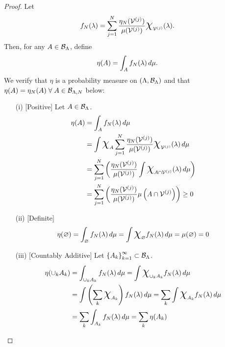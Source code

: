 \begin{proof}
Let
\begin{equation}\label{eq:finiteradon}
f_N (\param) = \sum_{j=1}^{N} \frac{\eta_N (\VV^{(j)}) }{\mu (\VV^{(j)})} \Chi_{\VV^{(j)}} (\param).
\end{equation}
Then, for any $A\in\mathcal{B}_{\Lambda}$, define
\begin{equation}\label{eq:approxmeasure}
\eta (A) = \int_A f_N (\lambda) \, d\mu.
\end{equation}
We verify that $\eta$ is a probability measure on $({\Lambda}, \mathcal{B}_{\Lambda})$ and that $\eta(A) = \eta_N(A) \; \forall \; A\in\mathcal{B}_{{\Lambda}, N}$ below:
\begin{itemize}
\item[(i)][Positive]
Let $A\in \mathcal{B}_{{\Lambda}}$.
\begin{equation*}
\begin{split}
\eta (A) &= \int_A f_N (\param) \, d\mu \\
&=  \int \Chi_A \sum_{j=1}^{N} \frac{\eta_N (\VV^{(j)}) }{\mu (\VV^{(j)})} \Chi_{\VV^{(j)}} (\param) \, d\mu \\
&= \sum_{j=1}^{N} \left ( \frac{\eta_N (\VV^{(j)}) }{\mu (\VV^{(j)})} \int \Chi_{A\cap\VV^{(j)}} (\param) \, d\mu \right ) \\
&= \sum_{j=1}^{N} \left ( \frac{\eta_N (\VV^{(j)}) }{\mu (\VV^{(j)})} \mu\left (A\cap\VV^{(j)}\right ) \right ) \geq 0
\end{split}
\end{equation*}

\item[(ii)][Definite]
\begin{equation*}
\eta (\nullset) = \int_\nullset f_N (\param) \, d\mu =\int \Chi_\nullset f_N (\param) \, d\mu = \mu(\nullset) = 0
\end{equation*}

\item[(iii)][Countably Additive]
Let $\left\{A_k\right\}_{k=1}^{\infty} \subset \mathcal{B}_{{\Lambda}}$.
\begin{equation*}
\begin{split}
\eta (\cup_k A_k) &= \int_{\cup_k A_k} f_N (\param) \, d\mu 
= \int \Chi_{\cup_k A_k} f_N (\param) \, d\mu \\
&= \int \left( \sum_k \Chi_{A_k} \right ) f_N (\param) \, d\mu
=   \sum_k \int \Chi_{A_k} f_N (\param) \, d\mu \\
&=   \sum_k \int_{A_k} f_N (\param) \, d\mu = \sum_k \eta(A_k)
\end{split}
\end{equation*}



\end{itemize}
\end{proof}
